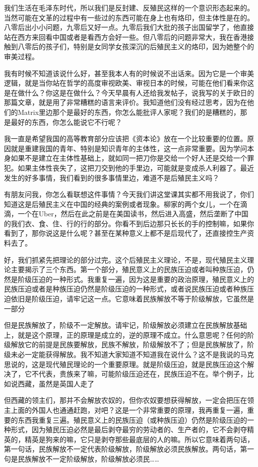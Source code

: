 \documentclass[UTF8, 12pt, a4paper]{ctexrep}
\begin{document}
我们生活在毛泽东时代，所以我们是反封建、反殖民这样的一个意识形态起来的。当然可能在文革的过程中有一些过的东西可能在身上也有烙印，但主体性是在的。八零后出小小问题，九零后又好一点。九零后我们大批的孩子出国留学了，他直接站在西方来回看中国或者是看西方会好一些。但八零后的问题非常大，我在香港接触到八零后的孩子们，特别是女同学女孩深沉的后殖民主义的烙印，因为她整个的审美过程。

我有时候不知道该说什么好，甚至我本人有的时候说不出话来。因为它是一个审美逻辑，就是当你站在哲学的高度审视欧美、审视日本的时候，可能在他们看来你这是在做什么？你这是在做什么？今天早晨有人还给我发帖子，说我写的关于欧日的那篇文章，就是用了非常糟糕的语言来评价。我知道他们没有经过思考，因为在他们的Matrix里边那个是最好的东西，你怎么能批评人家呢？我们的是糟糕的，那是最好的东西，你怎么能说它不行呢？

我一直是希望我国的高等教育部分应该把《资本论》放在一个比较重要的位置。原因就是重建我国的青年、特别是知识青年的主体性，这一点非常重要。因为学问本身如果不是建立在主体性基础上，就如同一把刀你是交给一个好人还是交给一个罪犯。如果主体性丧失了，这把刀交到他的手里边，可能就是变成杀人利器了。最近发生的好多事情，我们看到的很多事情里边，难道不是后殖民主义吗？

有朋友问我，你怎么看联想这件事情？今天我们讲这堂课其实都不用我说了，你们知道这是后殖民主义在中国的经典的案例或者现象。柳家的两个女儿，一个在滴滴，一个在Uber，然后在此之前是在美国读书，然后进入高盛，然后垄断了中国的我们衣、食、住、行的行的部分。你看不到后边那只长长的手的控制嘛，如果你看到了，那你说这是什么呢？甚至在某种意义上都不是后现代了，还直接控生产资料去了。

好，我们抓紧先把理论的部分过完。这个后殖民主义理论，不是，现代殖民主义理论主要揭示了三个东西。第一个部分，殖民意义上的民族压迫或者叫种族压迫，仍然是阶级压迫的一种形式。我重复一遍，因为这是重要的政治原理，殖民意义上的民族压迫或者是种族压迫仍然是阶级压迫的一种形式，或者说民族压迫或者种族压迫依旧是阶级压迫，请牢记这一点。它意味着民族解放不等于阶级解放，它虽然是一部分

但是民族解放了，阶级不一定解放。请牢记，阶级解放必须建立在民族解放基础上，就是这个原理，正的原理是成立的，逆的原理不成立。什么意思呢？任何的阶级解放它的前提是民族要解放，民族不解放，阶级解放不了；但是民族解放了，阶级未必一定能获得解放。我不知道大家知道不知道我在说什么？这不是我说的马克思说的，这是现代殖民理论的一个重要原理。就是阶级压迫，就是民族压迫这个解决了，它不代表，贵族来了嘛，可能阶级压迫还在，民族压迫不在。举个例子，比如说西藏，虽然是英国人走了

但西藏的领主们，那并不会解放农奴的，但你农奴要想获得解放，一定会把压在领主上面的外国人也通通赶跑，对吧？这是一个非常重要的原理，我再重复一遍，重要的东西我重复三遍。殖民意义上的民族压迫（或种族压迫）仍然是阶级压迫的一种形式，因为殖民压迫必然是最后剥夺最穷的劳动者的、生产者的，它不会剥夺精英的，精英是狗来的嘛，它只是剥夺那些最底层的人的嘛。所以它意味着两句话，第一句话，民族解放不一定代表阶级解放，阶级解放必须民族解放。两句话，第一句是民族解放不一定阶级解放，阶级解放必须民……
\end{document}
